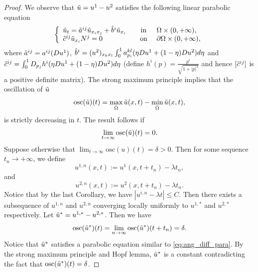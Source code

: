 \documentclass[12pt]{article}
\numberwithin{equation}{section}
\theoremstyle{plain}
\theoremstyle{definition}
\theoremstyle{remark}
\begin{document}
\begin{proof}
We observe that $\Tilde{u}=u^1-u^2$ satisfies the following linear parabolic equation
\begin{equation}  \label{eq:ang_diff_para}
    \left\{ \begin{array}{lcl}
            \Tilde{u}_t = \Tilde{a}^{ij} \Tilde{u}_{x_i x_j} + \Tilde{b}^{i} \Tilde{u}_{x_i}  \quad &  \text{in} & \ \Omega \times (0,+\infty), \\
            \Tilde{c}^{ij} \Tilde{u}_{x_i} N^j = 0 &  \text{on} & \ \partial \Omega \times (0,+\infty),
    \end{array}  \right.
\end{equation}
where $\Tilde{a}^{ij} = a^{ij} (Du^1)$,  $\Tilde{b}^{i} = (u^2)_{x_k x_l} \int^1_0 a^{kl}_{p_i} (\eta Du^1 + (1-\eta) Du^2 ) d\eta $ and $\Tilde{c}^{ij} = \int_0^1 D_{p_j} h^i (\eta Du^1 + (1-\eta) Du^2 ) d\eta$  (define $h^i(p) = \frac{p^i}{\sqrt{1+|p|^2}}$ and hence $[\Tilde{c}^{ij}]$ is a positive definite matrix). The strong maximum principle implies that the oscillation of $\Tilde{u}$
\begin{equation*}
    \text{osc}(\Tilde{u}) (t) = \max_{\Bar{\Omega}} \Tilde{u}(x,t) - \min_{\Bar{\Omega}} \Tilde{u}(x,t),
\end{equation*}
is strictly decreasing in $t$. The result follows if
\begin{equation*}
    \lim_{t\rightarrow \infty} \text{osc}(\Tilde{u}) (t) =0.
\end{equation*}
Suppose otherwise that $\lim_{t\rightarrow \infty} \text{osc}(u) (t) = \delta>0$. Then for some sequence $t_n \rightarrow +\infty$, we define
\begin{equation*}
    u^{1,n} (x,t) := u^1 (x,t+t_n) - \lambda t_n,
\end{equation*}
and 
\begin{equation*}
    u^{2,n} (x,t) := u^2 (x,t+t_n) - \lambda t_n.
\end{equation*}
Notice that by the last Corollary, we have $|u^{i,n}- \lambda t| \leq C$. 
Then there exists a subsequence of $u^{1,n}$ and $u^{2,n}$ converging locally uniformly to $u^{1,\ast}$ and $u^{2,\ast}$ respectively. Let $\Tilde{u}^{\ast} = u^{1,\ast} - u^{2,\ast}$. Then we have
\begin{equation*}
    \text{osc}(\Tilde{u}^{\ast}) (t) = \lim_{n\rightarrow \infty} \text{osc}(\Tilde{u}^{\ast}) (t+t_n) = \delta.
\end{equation*}
Notice that $\Tilde{u}^{\ast}$ satisfies a parabolic equation similar to \eqref{eq:ang_diff_para}. By the strong maximum principle and Hopf lemma, $\Tilde{u}^{\ast}$ is a constant contradicting the fact that $\text{osc}(\Tilde{u}^{\ast}) (t) = \delta$.
\end{proof}
\end{document}
